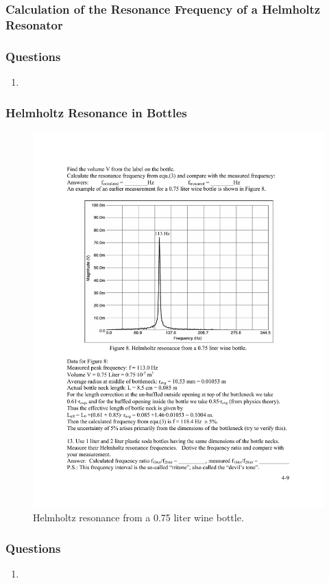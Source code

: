 \documentclass[11pt]{NSF}
\def\ben{\begin{enumerate}}
\def\een{\end{enumerate}}
\def\i{\item{}}
\begin{document}
\subsubsection{Calculation of the Resonance Frequency of a Helmholtz Resonator}


\subsubsection*{Questions}
\ben
\i  
\een

\subsubsection{Helmholtz Resonance in Bottles}

%
\begin{figure}[hbtp]
\begin{center}
\includegraphics[width=.7\textwidth]{fig4_8}
\caption{Helmholtz resonance from a 0.75 liter wine bottle.}
\label{f:8} 
\end{center} 
\end{figure}
%

\subsubsection*{Questions}
\ben
\i   
\een
\end{document}
